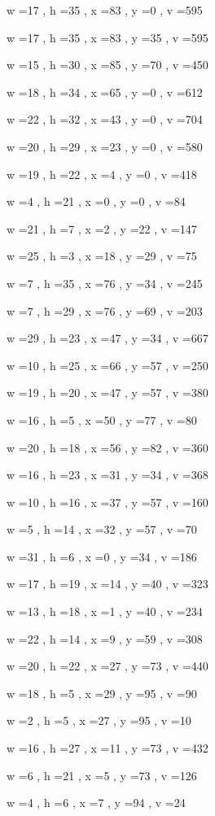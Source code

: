 \documentclass[11pt]{article}
\begin{document}
w =17 , h =35 , x =83 , y =0 , v =595
\par
w =17 , h =35 , x =83 , y =35 , v =595
\par
w =15 , h =30 , x =85 , y =70 , v =450
\par
w =18 , h =34 , x =65 , y =0 , v =612
\par
w =22 , h =32 , x =43 , y =0 , v =704
\par
w =20 , h =29 , x =23 , y =0 , v =580
\par
w =19 , h =22 , x =4 , y =0 , v =418
\par
w =4 , h =21 , x =0 , y =0 , v =84
\par
w =21 , h =7 , x =2 , y =22 , v =147
\par
w =25 , h =3 , x =18 , y =29 , v =75
\par
w =7 , h =35 , x =76 , y =34 , v =245
\par
w =7 , h =29 , x =76 , y =69 , v =203
\par
w =29 , h =23 , x =47 , y =34 , v =667
\par
w =10 , h =25 , x =66 , y =57 , v =250
\par
w =19 , h =20 , x =47 , y =57 , v =380
\par
w =16 , h =5 , x =50 , y =77 , v =80
\par
w =20 , h =18 , x =56 , y =82 , v =360
\par
w =16 , h =23 , x =31 , y =34 , v =368
\par
w =10 , h =16 , x =37 , y =57 , v =160
\par
w =5 , h =14 , x =32 , y =57 , v =70
\par
w =31 , h =6 , x =0 , y =34 , v =186
\par
w =17 , h =19 , x =14 , y =40 , v =323
\par
w =13 , h =18 , x =1 , y =40 , v =234
\par
w =22 , h =14 , x =9 , y =59 , v =308
\par
w =20 , h =22 , x =27 , y =73 , v =440
\par
w =18 , h =5 , x =29 , y =95 , v =90
\par
w =2 , h =5 , x =27 , y =95 , v =10
\par
w =16 , h =27 , x =11 , y =73 , v =432
\par
w =6 , h =21 , x =5 , y =73 , v =126
\par
w =4 , h =6 , x =7 , y =94 , v =24
\par
\newpage
\end{document}
